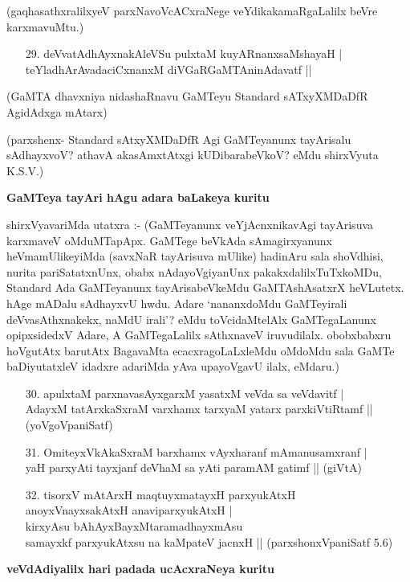(gaqhasathxralilxyeV parxNavoVcACxraNege veYdikakamaRgaLalilx beVre karxmavuMtu.)

\begin{itemize}
\item[29.] deVvatAdhAyxnakAleVSu pulxtaM kuyARnanxsaMshayaH |\\
teYladhArAvadaciCxnanxM diVGaRGaMTAninAdavatf ||
\end{itemize}

(GaMTA dhavxniya nidashaRnavu GaMTeyu {\rm Standard} sATxyXMDaDfR AgidAdxga mAtarx)

(parxshenx- {\rm Standard} sAtxyXMDaDfR Agi GaMTeyanunx tayArisalu sAdhayxvoV? athavA akasAmxtAtxgi kUDibarabeVkoV? eMdu shirxVyuta {\rm K.S.V.})

{\bf GaMTeya tayAri hAgu adara baLakeya kuritu}

shirxVyavariMda utatxra :- (GaMTeyanunx veYjAcnxnikavAgi tayArisuva karxmaveV oMduMTapApx. GaMTege beVkAda sAmagirxyanunx heVmamUlikeyiMda (savxNaR tayArisuva mUlike) hadinAru sala shoVdhisi, nurita pariSatatxnUnx, obabx nAdayoVgiyanUnx pakakxdalilxTuTxkoMDu, {\rm Standard} Ada GaMTeyanunx tayArisabeVkeMdu GaMTAshAsatxrX heVLutetx. hAge mADalu sAdhayxvU hwdu. Adare `nananxdoMdu GaMTeyirali deVvasAthxnakekx, naMdU irali'? eMdu toVcidaMtelAlx GaMTegaLanunx opipxsidedxV Adare, A GaMTegaLalilx sAthxnaveV iruvudilalx. obobxbabxru hoVgutAtx barutAtx BagavaMta ecacxragoLaLxleMdu oMdoMdu sala GaMTe baDiyutatxleV idadxre adariMda yAva upayoVgavU ilalx, eMdaru.)

\begin{itemize}
\item[30.] apulxtaM parxnavasAyxgarxM yasatxM veVda sa veVdavitf |\\
AdayxM tatArxkaSxraM varxhamx tarxyaM yatarx parxkiVtiRtamf ||
\hfill{(yoVgoVpaniSatf)}
\item[31.] OmiteyxVkAkaSxraM barxhamx vAyxharanf mAmanusamxranf |\\
yaH parxyAti tayxjanf deVhaM sa yAti paramAM gatimf ||
\hfill{(giVtA)}
\item[32.] tisorxV mAtArxH maqtuyxmatayxH parxyukAtxH\\
anoyxVnayxsakAtxH anaviparxyukAtxH |\\
kirxyAsu bAhAyxBayxMtaramadhayxmAsu\\
samayxkf parxyukAtxsu na kaMpateV jacnxH ||
\hfill{(parxshonxVpaniSatf 5.6)}
\end{itemize}

{\bf veVdAdiyalilx hari padada ucAcxraNeya kuritu}

